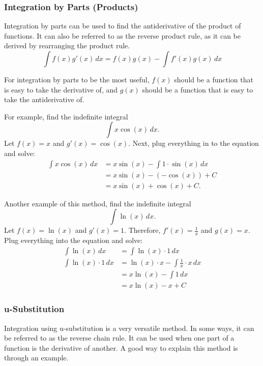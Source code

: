 \documentclass[12pt]{article}
\begin{document}
\subsubsection{Integration by Parts (Products)}
Integration by parts can be used to find the antiderivative of the product of functions. It can also be referred to as the reverse product rule, as it can be derived by rearranging the product rule.
\[ \int f(x) g'(x) \, dx = f(x) g(x) - \int f'(x) g(x) \, dx \]

For integration by parts to be the most useful, $f(x)$ should be a function that is easy to take the derivative of, and $g(x)$ should be a function that is easy to take the antiderivative of.

\noindent For example, find the indefinite integral
\[ \int x \cos(x) \, dx. \]
Let $f(x) = x$ and $g'(x) = \cos(x)$. Next, plug everything in to the equation and solve:
\begin{align*}
    \int x \cos(x) \, dx & = x \sin(x) - \int 1 \cdot \sin(x) \, dx  \\
                         & = x \sin(x) - \left( -\cos(x) \right) + C \\
                         & = x\sin(x) + \cos(x) + C.
\end{align*}

\noindent Another example of this method, find the indefinite integral
\[ \int \ln(x) \, dx. \]
Let $f(x) = \ln(x)$ and $g'(x) = 1$. Therefore, $f'(x) = \frac{1}{x}$ and $g(x) = x$. Plug everything into the equation and solve:
\begin{align*}
    \int \ln(x) \, dx         & = \int \ln(x) \cdot 1 \, dx                       \\
    \int \ln(x) \cdot 1 \, dx & = \ln(x) \cdot x - \int \frac{1}{x} \cdot x \, dx \\[6pt]
                              & = x \ln(x) - \int 1 \, dx                         \\
                              & = x \ln(x) - x + C
\end{align*}

\subsubsection{u-Substitution}
Integration using u-substitution is a very versatile method. In some ways, it can be referred to as the reverse chain rule. It can be used when one part of a function is the derivative of another. A good way to explain this method is through an example.
\end{document}
